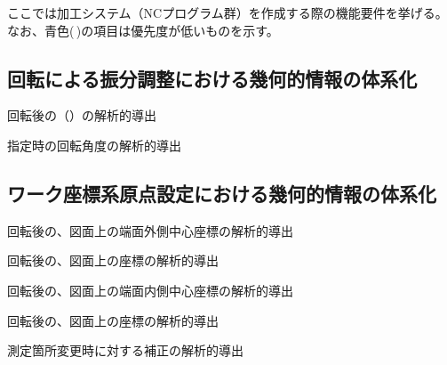 

ここでは加工システム（NCプログラム群）を作成する際の機能要件を挙げる。
なお、青色(\,\sarrow\!)の項目は優先度が低いものを示す。




\subsection{\Table 回転による振分調整における幾何的情報の体系化}
\begin{enumerate}[label={\sarrow[red]}]
\item \Table 回転後の\AlocationLength（\ReAlocationLength）の解析的導出
\item \ReAlocationLength 指定時の\Table 回転角度の解析的導出
\end{enumerate}


\subsection{ワーク座標系原点設定における幾何的情報の体系化}
\begin{enumerate}[label={\sarrow[red]}]
\item \Table 回転後の、図面上の端面外側中心座標の解析的導出
\item \Table 回転後の、図面上の\OutcutCenter 座標の解析的導出
\item \Table 回転後の、図面上の端面内側中心座標の解析的導出
\item \Table 回転後の、図面上の\KeywayCenter 座標の解析的導出
\item 測定箇所変更時に対する補正の解析的導出
\end{enumerate}


